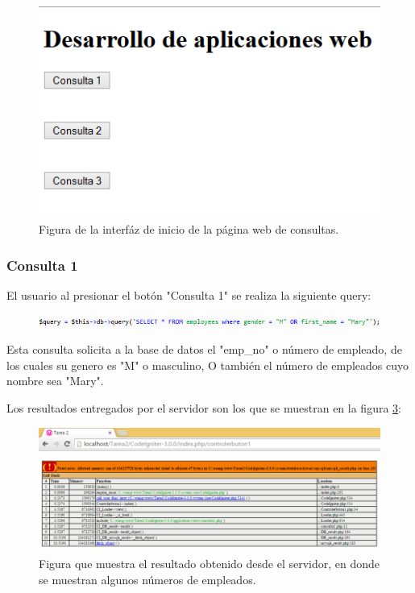 \begin{figure}[htb]
	\label{Figura}
	\begin{center}
		\includegraphics[scale=0.5]{imagenes/inicio.png}
	\end{center}
	\caption{Figura de la interfáz de inicio de la página web de consultas.}
\end{figure}

\subsubsection{Consulta 1}

El usuario al presionar el botón "Consulta 1" se realiza la siguiente query:

\begin{figure}[htb]
	\label{Figura2}
	\begin{center}
		\includegraphics[scale=0.7]{imagenes/query1.png}
	\end{center}
\end{figure}

Esta consulta solicita a la base de datos el "emp\_no" o número de empleado, de los cuales su genero es "M" o masculino, O también el número de empleados cuyo nombre sea "Mary".

Los resultados entregados por el servidor son los que se muestran en la figura \ref{Figura3}:

\begin{figure}[htb]
	\label{Figura3}
	\begin{center}
		\includegraphics[scale=0.7]{imagenes/resultado1.png}
		\caption{Figura que muestra el resultado obtenido desde el servidor, en donde se muestran algunos números de empleados.}
	\end{center}
\end{figure}

